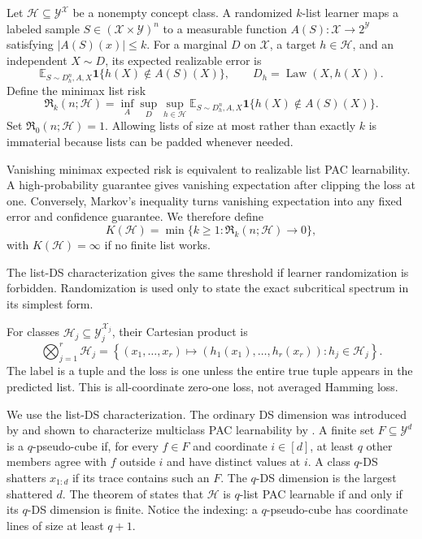 \documentclass{article}
\theoremstyle{definition}
\theoremstyle{remark}
\newcommand{\E}{\mathbb E}
\newcommand{\cH}{\mathcal H}
\newcommand{\cY}{\mathcal Y}
\newcommand{\cX}{\mathcal X}
\newcommand{\Risk}{\mathfrak R}
\newcommand{\1}{\mathbf 1}
\begin{document}
Let \(\cH\subseteq\cY^{\cX}\) be a nonempty concept class. A randomized \(k\)-list learner maps a labeled sample \(S\in(\cX\times\cY)^n\) to a measurable function \(A(S):\cX\to2^{\cY}\) satisfying \(|A(S)(x)|\le k\). For a marginal \(D\) on \(\cX\), a target \(h\in\cH\), and an independent \(X\sim D\), its expected realizable error is \[ \E_{S\sim D_h^n,A,X}\1\{h(X)\notin A(S)(X)\}, \qquad D_h=\operatorname{Law}(X,h(X)). \] Define the minimax list risk
\begin{equation}
\label{eq:risk-def}
\Risk_k(n;\cH)
=\inf_A\sup_{D}\sup_{h\in\cH}
\E_{S\sim D_h^n,A,X}\1\{h(X)\notin A(S)(X)\}.
\end{equation}
Set \(\Risk_0(n;\cH)=1\). Allowing lists of size at most rather than exactly \(k\) is immaterial because lists can be padded whenever needed.

Vanishing minimax expected risk is equivalent to realizable list PAC learnability. A high-probability guarantee gives vanishing expectation after clipping the loss at one. Conversely, Markov's inequality turns vanishing expectation into any fixed error and confidence guarantee. We therefore define \[ K(\cH)=\min\{k\ge1:\Risk_k(n;\cH)\to0\}, \] with \(K(\cH)=\infty\) if no finite list works.

The list-DS characterization gives the same threshold if learner randomization is forbidden. Randomization is used only to state the exact subcritical spectrum in its simplest form.

For classes \(\cH_j\subseteq\cY_j^{\cX_j}\), their Cartesian product is \[ \bigotimes_{j=1}^r\cH_j =\left\{(x_1,\ldots,x_r)\mapsto(h_1(x_1),\ldots,h_r(x_r)):h_j\in\cH_j\right\}. \] The label is a tuple and the loss is one unless the entire true tuple appears in the predicted list. This is all-coordinate zero-one loss, not averaged Hamming loss.

We use the list-DS characterization. The ordinary DS dimension was introduced by \citet{daniely2014optimal} and shown to characterize multiclass PAC learnability by \citet{brukhim2022characterization}. A finite set \(F\subseteq\cY^d\) is a \(q\)-pseudo-cube if, for every \(f\in F\) and coordinate \(i\in[d]\), at least \(q\) other members agree with \(f\) outside \(i\) and have distinct values at \(i\). A class \(q\)-DS shatters \(x_{1:d}\) if its trace contains such an \(F\). The \(q\)-DS dimension is the largest shattered \(d\). The theorem of \citet{charikar2023characterization} states that \(\cH\) is \(q\)-list PAC learnable if and only if its \(q\)-DS dimension is finite. Notice the indexing: a \(q\)-pseudo-cube has coordinate lines of size at least \(q+1\).
\end{document}
